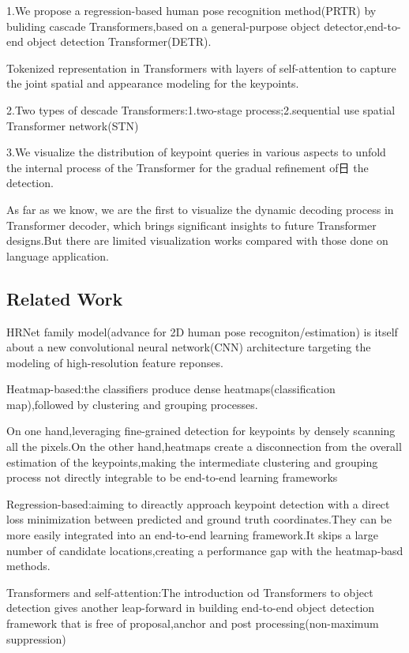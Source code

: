 \documentclass[11pt]{article}
\begin{document}
1.We propose a regression-based human pose recognition method(PRTR) by buliding cascade Transformers,based on a general-purpose object detector,end-to-end object detection Transformer(DETR).

Tokenized representation in Transformers with layers of self-attention to capture the joint spatial and appearance modeling for the keypoints.

2.Two types of descade Transformers:1.two-stage process;2.sequential use spatial Transformer network(STN)

3.We visualize the distribution of keypoint queries in various aspects to unfold the internal process of the Transformer for the gradual refinement of日 the detection.

As far as we know, we are the first to visualize the dynamic decoding process in Transformer decoder, which brings significant insights to future Transformer designs.But there are limited visualization works compared with those done on language application.
\subsection{Related Work}

HRNet family model(advance for 2D human pose recogniton/estimation) is itself about a new convolutional neural network(CNN) architecture targeting the modeling of high-resolution feature reponses.

Heatmap-based:the classifiers produce dense heatmaps(classification map),followed by clustering and grouping processes.

On one hand,leveraging fine-grained detection for keypoints by densely scanning all the pixels.On the other hand,heatmaps create a disconnection from the overall estimation of the keypoints,making the intermediate clustering and grouping process not directly integrable to be end-to-end learning frameworks

Regression-based:aiming to direactly approach keypoint detection with a direct loss minimization between predicted and ground truth coordinates.They can be more easily integrated into an end-to-end learning framework.It skips a large number of candidate locations,creating a performance gap with the heatmap-basd methods.

Transformers and self-attention:The introduction od Transformers to object detection gives another leap-forward in building end-to-end object detection framework that is free of proposal,anchor and post processing(non-maximum suppression)
\end{document}
